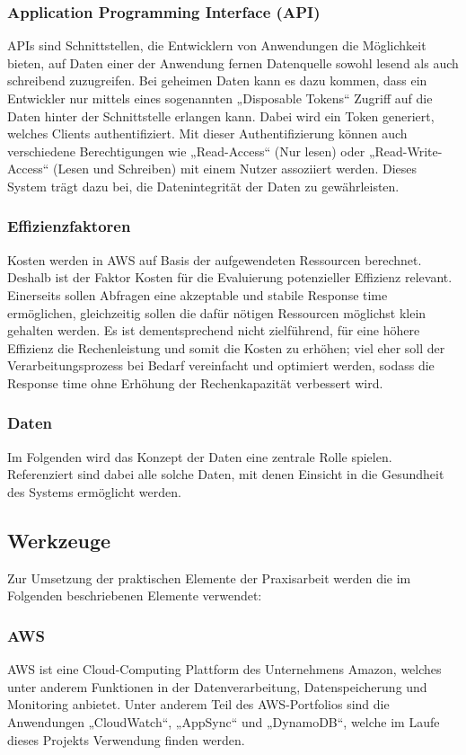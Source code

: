 \subsubsection{Application Programming Interface (API)}
APIs sind Schnittstellen, die Entwicklern von Anwendungen die Möglichkeit bieten, auf Daten einer der Anwendung fernen Datenquelle sowohl lesend als auch schreibend zuzugreifen. \cite{Fielding2000} Bei geheimen Daten kann es dazu kommen, dass ein Entwickler nur mittels eines sogenannten „Disposable Tokens“ Zugriff auf die Daten hinter der Schnittstelle erlangen kann. Dabei wird ein Token generiert, welches Clients authentifiziert. Mit dieser Authentifizierung können auch verschiedene Berechtigungen wie „Read-Access“ (Nur lesen) oder „Read-Write-Access“ (Lesen und Schreiben) mit einem Nutzer assoziiert werden. Dieses System trägt dazu bei, die Datenintegrität der Daten zu gewährleisten.
\subsubsection{Effizienzfaktoren} 
Kosten werden in AWS auf Basis der aufgewendeten Ressourcen berechnet. \cite{Kavis2014} Deshalb ist der Faktor Kosten für die Evaluierung potenzieller Effizienz relevant. Einerseits sollen Abfragen eine akzeptable und stabile Response time ermöglichen, gleichzeitig sollen die dafür nötigen Ressourcen möglichst klein gehalten werden. Es ist dementsprechend nicht zielführend, für eine höhere Effizienz die Rechenleistung und somit die Kosten zu erhöhen; viel eher soll der Verarbeitungsprozess bei Bedarf vereinfacht und optimiert werden, sodass die Response time ohne Erhöhung der Rechenkapazität verbessert wird. \cite{AWS2024e} 
\subsubsection{Daten}
Im Folgenden wird das Konzept der Daten eine zentrale Rolle spielen. Referenziert sind dabei alle solche Daten, mit denen Einsicht in die Gesundheit des Systems ermöglicht werden. 
\subsection{Werkzeuge} 
Zur Umsetzung der praktischen Elemente der Praxisarbeit werden die im Folgenden beschriebenen Elemente verwendet: 
\subsubsection{AWS} 
AWS ist eine Cloud-Computing Plattform des Unternehmens Amazon, welches unter anderem Funktionen in der Datenverarbeitung, Datenspeicherung und Monitoring anbietet. Unter anderem Teil des AWS-Portfolios sind die Anwendungen „CloudWatch“, „AppSync“ und „DynamoDB“, welche im Laufe dieses Projekts Verwendung finden werden. \cite{Zhang2010} 
